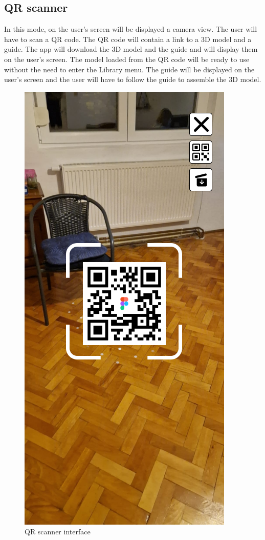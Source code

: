 \subsection{QR scanner}
In this mode, on the user's screen will be displayed a camera view. The user will have to scan a QR code. The QR code will contain a link to a 3D model and a guide. The app will download the 3D model and the guide and will display them on the user's screen. The model loaded from the QR code will be ready to use without the need to enter the Library menu. The guide will be displayed on the user's screen and the user will have to follow the guide to assemble the 3D model.

\begin{figure}[h!]
    \begin{center}
        \includegraphics[scale=0.5]{img/App_mock/iPhone 14 - 3.png}
        \caption{QR scanner interface}
        \label{fig:qr-scanner}
    \end{center}
\end{figure}
\pagebreak

